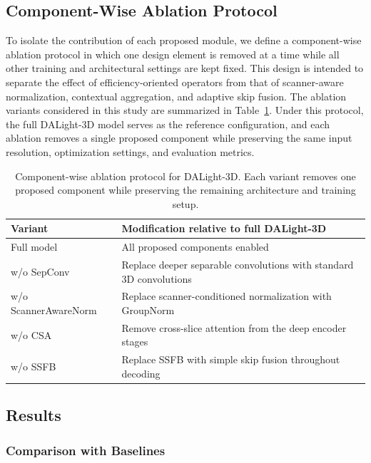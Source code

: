\documentclass[conference]{IEEEtran}
\begin{document}
\subsection{Component-Wise Ablation Protocol}
\label{sec:ablation_protocol}

To isolate the contribution of each proposed module, we define a component-wise ablation protocol in which one design element is removed at a time while all other training and architectural settings are kept fixed. This design is intended to separate the effect of efficiency-oriented operators from that of scanner-aware normalization, contextual aggregation, and adaptive skip fusion. The ablation variants considered in this study are summarized in Table~\ref{tab:ablation_protocol}. Under this protocol, the full DALight-3D model serves as the reference configuration, and each ablation removes a single proposed component while preserving the same input resolution, optimization settings, and evaluation metrics.

\begin{table}[t]
\centering
\caption{Component-wise ablation protocol for DALight-3D. Each variant removes one proposed component while preserving the remaining architecture and training setup.}
\label{tab:ablation_protocol}
\begin{tabular}{ll}
\toprule
Variant & Modification relative to full DALight-3D \\
\midrule
Full model & All proposed components enabled \\
w/o SepConv & Replace deeper separable convolutions with standard 3D convolutions \\
w/o ScannerAwareNorm & Replace scanner-conditioned normalization with GroupNorm \\
w/o CSA & Remove cross-slice attention from the deep encoder stages \\
w/o SSFB & Replace SSFB with simple skip fusion throughout decoding \\
\bottomrule
\end{tabular}
\end{table}

\subsection{Results}
\label{sec:results}

\subsubsection{Comparison with Baselines}
\end{document}
